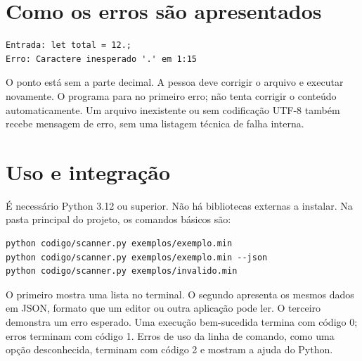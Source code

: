\documentclass[12pt,a4paper]{article}
\begin{document}
\section{Como os erros são apresentados}
\begin{lstlisting}[language={}]
Entrada: let total = 12.;
Erro: Caractere inesperado '.' em 1:15
\end{lstlisting}
O ponto está sem a parte decimal. A pessoa deve corrigir o arquivo e executar
novamente. O programa para no primeiro erro; não tenta corrigir o conteúdo
automaticamente. Um arquivo inexistente ou sem codificação UTF-8 também recebe
mensagem de erro, sem uma listagem técnica de falha interna.

\newpage
\section{Uso e integração}
É necessário Python 3.12 ou superior. Não há bibliotecas externas a instalar.
Na pasta principal do projeto, os comandos básicos são:
\begin{lstlisting}[language={}]
python codigo/scanner.py exemplos/exemplo.min
python codigo/scanner.py exemplos/exemplo.min --json
python codigo/scanner.py exemplos/invalido.min
\end{lstlisting}
O primeiro mostra uma lista no terminal. O segundo apresenta os mesmos dados
em JSON, formato que um editor ou outra aplicação pode ler. O terceiro demonstra
um erro esperado. Uma execução bem-sucedida termina com código 0; erros terminam
com código 1. Erros de uso da linha de comando, como uma opção desconhecida,
terminam com código 2 e mostram a ajuda do Python.
\end{document}

